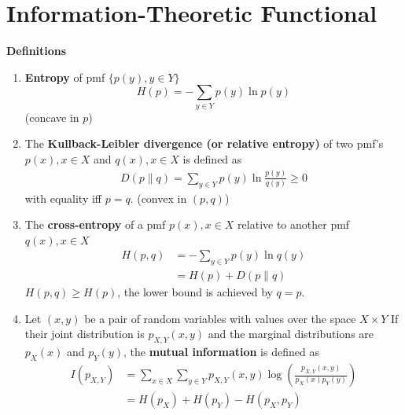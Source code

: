 \documentclass[11pt]{elegantbook}
\begin{document}
\chapter{Information-Theoretic Functional}
\textbf{Definitions}
\begin{enumerate}
    \item
    \begin{definition}[Entropy]
        \textbf{Entropy} of pmf $\{p(y),y\in Y\}$ $$H(p)=-\sum_{y\in Y}p(y)\ln p(y)$$
        (concave in $p$)
    \end{definition}
    \item
    \begin{definition}
        The \textbf{Kullback-Leibler divergence (or relative entropy)} of two pmf's $p(x), x\in X$ and $q(x), x\in X$ is defined as
        \begin{equation}
            \begin{aligned}
                D(p\| q)=\sum_{y\in Y}p(y)\ln\frac{p(y)}{q(y)}\geq 0
            \end{aligned}
            \nonumber
        \end{equation}
        with equality iff $p=q$. (convex in $(p,q)$)
    \end{definition}
    \item
    \begin{definition}
        The \textbf{cross-entropy} of a pmf $p(x),x\in X$ relative to another pmf $q(x), x\in X$
        \begin{equation}
            \begin{aligned}
                H(p, q)&=-\sum_{y\in Y}p(y)\ln q(y)\\&=H(p)+D(p\| q)
            \end{aligned}
            \nonumber
        \end{equation}
        $H(p,q)\geq H(p)$, the lower bound is achieved by $q=p$.
    \end{definition}
    \item 
    \begin{definition}
        Let $(x,y)$ be a pair of random variables with values over the space $X\times Y$ If their joint distribution is $p_{X,Y}(x,y)$ and the marginal distributions are $p_X(x)$ and $p_Y(y)$, the \textbf{mutual information} is defined as
        \begin{equation}
            \begin{aligned}
                I(p_{X,Y})&=\sum_{x\in X}\sum_{y\in Y}p_{X,Y}(x,y)\log\left(\frac{p_{X,Y}(x,y)}{p_X(x)p_Y(y)}\right)\\
                &=H(p_X)+H(p_Y)-H(p_X,p_Y)
            \end{aligned}
            \nonumber
        \end{equation}
    \end{definition}
\end{enumerate}
\end{document}
